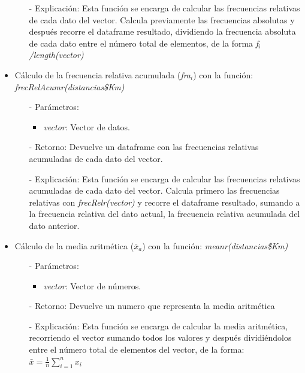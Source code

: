 \documentclass[a4paper, 12pt]{article}
\begin{document}
\begin{itemize}
\begin{itemize}
                \item[-] Explicación: Esta función se encarga de calcular las frecuencias relativas de cada dato del vector. Calcula previamente las frecuencias absolutas y después recorre el dataframe resultado, dividiendo la frecuencia absoluta de cada dato entre el número total de elementos, de la forma \emph{f$_{i}$/length(vector)}
            \end{itemize}
        
            \item Cálculo de la frecuencia relativa acumulada (\emph{fra$_{i}$}) con la función: \emph{frecRelAcumr(distancias\$Km)}
            \begin{itemize}
                \item[-] Parámetros: 
                \begin{itemize}
                    \item \emph{vector}: Vector de datos.
                \end{itemize}

                \item[-] Retorno: Devuelve un dataframe con las frecuencias relativas acumuladas de cada dato del vector. 

                \item[-] Explicación: Esta función se encarga de calcular las frecuencias relativas acumuladas de cada dato del vector. Calcula primero las frecuencias relativas con \emph{frecRelr(vector)} y recorre el dataframe resultado, sumando a la frecuencia relativa del dato actual, la frecuencia relativa acumulada del dato anterior.
            \end{itemize}
            
            \item Cálculo de la media aritmética (\emph{$\bar{x}_{a}$}) con la función: \emph{meanr(distancias\$Km)}
            \begin{itemize}
                \item[-] Parámetros: 
                \begin{itemize}
                    \item \emph{vector}: Vector de números.
                \end{itemize}

                \item[-] Retorno: Devuelve un numero que representa la media aritmética 

                \item[-] Explicación: Esta función se encarga de calcular la media aritmética, recorriendo el vector sumando todos los valores y después dividiéndolos entre el número total de elementos del vector, de la forma: \\
                $\bar{x} = \frac{1}{n} \sum_{i=1}^{n} x_i$
            \end{itemize}
            

\end{itemize}
\end{document}
